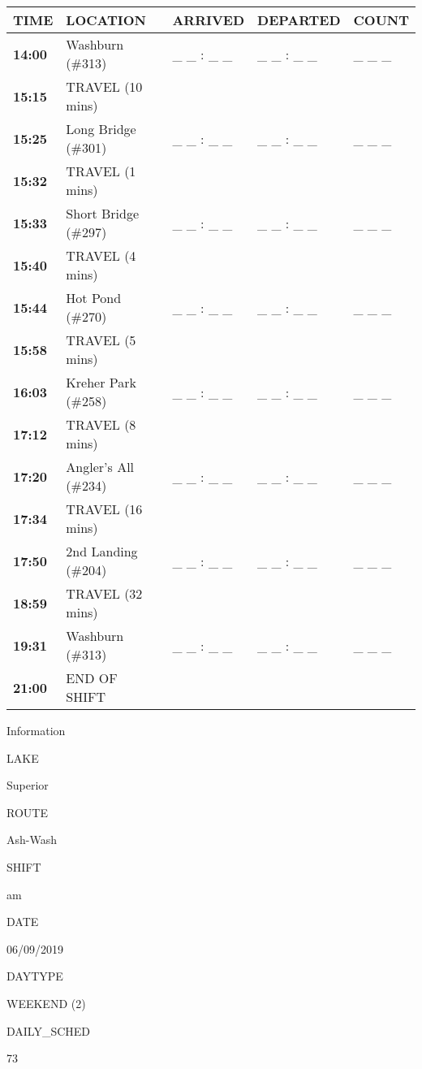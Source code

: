 \documentclass[]{article}
\begin{document}
\begin{tabular}{>{\bfseries}lllll}
\toprule
\textbf{TIME} & \textbf{LOCATION} & \textbf{ARRIVED} & \textbf{DEPARTED} & \textbf{COUNT}\\
\midrule
14:00 & Washburn (\#313) & \_ \_ : \_ \_ & \_ \_ : \_ \_ & \_ \_ \_\\
15:15 & TRAVEL (10 mins) &  &  & \\
15:25 & Long Bridge (\#301) & \_ \_ : \_ \_ & \_ \_ : \_ \_ & \_ \_ \_\\
15:32 & TRAVEL (1 mins) &  &  & \\
15:33 & Short Bridge (\#297) & \_ \_ : \_ \_ & \_ \_ : \_ \_ & \_ \_ \_\\
15:40 & TRAVEL (4 mins) &  &  & \\
15:44 & Hot Pond (\#270) & \_ \_ : \_ \_ & \_ \_ : \_ \_ & \_ \_ \_\\
15:58 & TRAVEL (5 mins) &  &  & \\
16:03 & Kreher Park (\#258) & \_ \_ : \_ \_ & \_ \_ : \_ \_ & \_ \_ \_\\
17:12 & TRAVEL (8 mins) &  &  & \\
17:20 & Angler's All (\#234) & \_ \_ : \_ \_ & \_ \_ : \_ \_ & \_ \_ \_\\
17:34 & TRAVEL (16 mins) &  &  & \\
17:50 & 2nd Landing (\#204) & \_ \_ : \_ \_ & \_ \_ : \_ \_ & \_ \_ \_\\
18:59 & TRAVEL (32 mins) &  &  & \\
19:31 & Washburn (\#313) & \_ \_ : \_ \_ & \_ \_ : \_ \_ & \_ \_ \_\\
21:00 & END OF SHIFT &  &  & \\
\bottomrule
\end{tabular}\newpage

Information

LAKE

Superior

ROUTE

Ash-Wash

SHIFT

am

DATE

06/09/2019

DAYTYPE

WEEKEND (2)

DAILY\_SCHED

73

\vspace{24pt}
\end{document}
